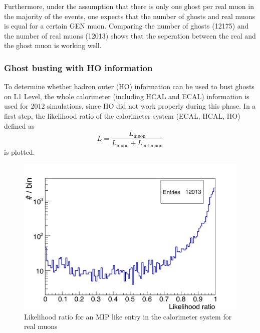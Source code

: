 Furthermore, under the assumption that there is only one ghost per real muon in the majority of the events, one expects that the number of ghosts and real muons is equal for a certain GEN muon. Comparing the number of ghosts (12175) and the number of real muons (12013) shows that the seperation between the real and the ghost muon is working well.

\subsubsection{Ghost busting with HO information}
To determine whether hadron outer (HO) information can be used to bust ghosts on L1 Level, the whole calorimeter (including HCAL and ECAL) information is used for 2012 simulations, since HO did not work properly during this phase. In a first step, the likelihood ratio of the calorimeter system (ECAL, HCAL, HO) defined as
\begin{equation}
L=\frac{L_{\mathrm{muon}}}{L_{\mathrm{muon}} + L_\mathrm{not\ muon}}
\end{equation}
is plotted.
\begin{figure}[b]
\centering
\begin{minipage}[t]{0.95\textwidth}
\includegraphics[width=\textwidth]{Figures/scheuch/LikelihoodNonGhost.png}
\caption{Likelihood ratio for an MIP like entry in the calorimeter system for real muons}
\label{LikelihoodReal}
\end{minipage}
\end{figure}
